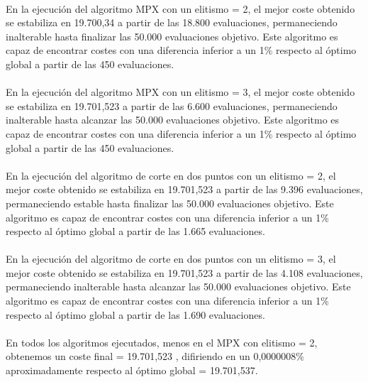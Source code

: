	\paragraph{}En la ejecución del algoritmo MPX con un elitismo = 2, el mejor coste obtenido se estabiliza en 19.700,34 a partir de las 18.800 evaluaciones, permaneciendo inalterable hasta finalizar las 50.000 evaluaciones objetivo. Este algoritmo es capaz de encontrar costes con una diferencia inferior a un 1\% respecto al óptimo global a partir de las 450 evaluaciones.
	
	\paragraph{}En la ejecución del algoritmo MPX con un elitismo = 3, el mejor coste obtenido se estabiliza en 19.701,523 a partir de las 6.600 evaluaciones, permaneciendo inalterable hasta alcanzar las 50.000 evaluaciones objetivo. Este algoritmo es capaz de encontrar costes con una diferencia inferior a un 1\% respecto al óptimo global a partir de las 450 evaluaciones.
	
	\paragraph{}En la ejecución del algoritmo de corte en dos puntos con un elitismo = 2, el mejor coste obtenido se estabiliza en 19.701,523 a partir de las 9.396 evaluaciones, permaneciendo estable hasta finalizar las 50.000 evaluaciones objetivo. Este algoritmo es capaz de encontrar costes con una diferencia inferior a un 1\% respecto al óptimo global a partir de las 1.665 evaluaciones.
	
	\paragraph{}En la ejecución del algoritmo de corte en dos puntos con un elitismo = 3, el mejor coste obtenido se estabiliza en 19.701,523 a partir de las 4.108 evaluaciones, permaneciendo inalterable hasta alcanzar las 50.000 evaluaciones objetivo. Este algoritmo es capaz de encontrar costes con una diferencia inferior a un 1\% respecto al óptimo global a partir de las 1.690 evaluaciones.
	
	\paragraph{}En todos los algoritmos ejecutados, menos en el MPX con elitismo = 2, obtenemos un coste final = 19.701,523 , difiriendo en un 0,0000008\% aproximadamente respecto al óptimo global = 19.701,537.
	
